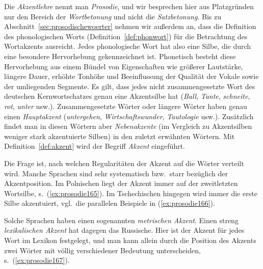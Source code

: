 Die \textit{Akzentlehre} nennt man \textit{Prosodie}, und wir besprechen hier aus Platzgründen nur den Bereich der \textit{Wortbetonung} und \zB nicht die \textit{Satzbetonung}.
Bis zu Abschnitt~\ref{sec:prosodischewoerter} nehmen wir außerdem an, dass die Definition des phonologischen Worts (Definition~\ref{def:phonwort}) für die Betrachtung des Wortakzents ausreicht.
Jedes phonologische Wort hat also eine Silbe, die durch eine besondere Hervorhebung gekennzeichnet ist.
Phonetisch besteht diese Hervorhebung aus einem Bündel von Eigenschaften wie größerer Lautstärke, längere Dauer, erhöhte Tonhöhe und Beeinflussung der Qualität der Vokale sowie der umliegenden Segmente.
Es gilt, dass jedes nicht zusammengesetzte Wort des deutschen Kernwortschatzes genau eine Akzentsilbe hat (\textit{\Akz Ball}, \textit{\Akz Tante}, \textit{\Akz schneite}, \textit{\Akz rot}, \textit{\Akz unter} usw.).
Zusammengesetzte Wörter oder längere Wörter haben genau einen \textit{Hauptakzent} (\textit{\Akz untergehen}, \textit{\Akz Wirtschaftswunder}, \textit{Tautolo\Akz gie} usw.).
Zusätzlich findet man in diesen Wörtern aber \textit{Nebenakzente} (im Vergleich zu Akzentsilben weniger stark akzentuierte Silben) in den zuletzt erwähnten Wörtern.
Mit Definition~\ref{def:akzent} wird der Begriff \textit{Akzent} eingeführt.

\Enl[2]


Die Frage ist, nach welchen Regularitäten der Akzent auf die Wörter verteilt wird.
Manche Sprachen sind sehr systematisch bzw.\ starr bezüglich der Akzentposition.
Im Polnischen liegt der Akzent immer auf der zweitletzten Wortsilbe, s.\ (\ref{ex:prosodie165}).
Im Tschechischen hingegen wird immer die erste Silbe akzentuiert, vgl.\ die parallelen Beispiele in (\ref{ex:prosodie166}).

\begin{exe}
\end{exe}

Solche Sprachen haben einen sogenannten \textit{metrischen Akzent}.
Einen streng \textit{lexikalischen Akzent} hat dagegen das Russische.
Hier ist der Akzent für jedes Wort im Lexikon festgelegt, und man kann allein durch die Position des Akzents zwei Wörter mit völlig verschiedener Bedeutung unterscheiden, s.\ (\ref{ex:prosodie167}).

